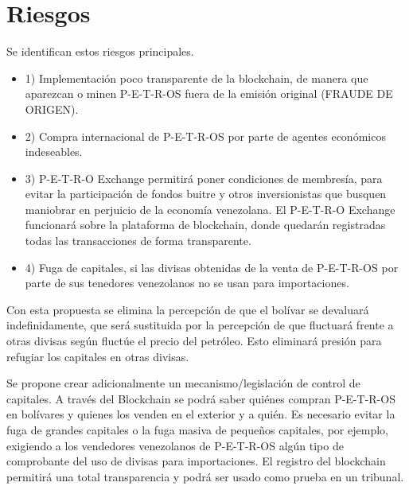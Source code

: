 %
\section{Riesgos}
\label{sec:riesgo}
%
Se identifican estos riesgos principales.
\begin{itemize}

    \item{1)} Implementación poco transparente de la blockchain, de manera que aparezcan o minen P-E-T-R-OS fuera de la emisión original (FRAUDE DE ORIGEN).
    \item{2)} Compra internacional de P-E-T-R-OS por parte de agentes económicos indeseables.
    \item{3)} P-E-T-R-O Exchange permitirá poner condiciones de membresía, para evitar la participación de fondos buitre y otros inversionistas que busquen maniobrar en perjuicio de la economía venezolana. El P-E-T-R-O Exchange funcionará sobre la plataforma de blockchain, donde quedarán registradas todas las transacciones de forma transparente.
    \item{4)} Fuga de capitales, si las divisas obtenidas de la venta de P-E-T-R-OS por parte de sus tenedores venezolanos no se usan para importaciones.
\end{itemize}

Con esta propuesta se elimina la percepción de que el bolívar se devaluará indefinidamente, que será sustituida por la percepción de que fluctuará frente a otras divisas según fluctúe el precio del petróleo. Esto eliminará presión para refugiar los capitales en otras divisas.

Se propone crear adicionalmente un mecanismo/legislación de control de capitales. A través del Blockchain se podrá saber quiénes compran P-E-T-R-OS en bolívares y quienes los venden en el exterior y a quién. Es necesario evitar la fuga de grandes capitales o la fuga masiva de pequeños capitales, por ejemplo, exigiendo a los vendedores venezolanos de P-E-T-R-OS algún tipo de comprobante del uso de divisas para importaciones. El registro del blockchain permitirá una total transparencia y podrá ser usado como prueba en un tribunal.